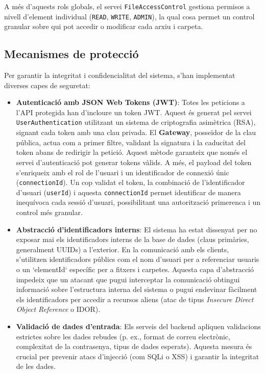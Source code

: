 A més d'aquests rols globals, el servei \texttt{FileAccessControl} gestiona permisos a nivell d'element individual (\texttt{READ}, \texttt{WRITE}, \texttt{ADMIN}), la qual cosa permet un control granular sobre qui pot accedir o modificar cada arxiu i carpeta.

\subsection{Mecanismes de protecció}
Per garantir la integritat i confidencialitat del sistema, s'han implementat diverses capes de seguretat:
\begin{itemize}
    \item \textbf{Autenticació amb JSON Web Tokens (JWT)}: Totes les peticions a l'API protegida han d'incloure un token JWT. Aquest és generat pel servei \texttt{UserAuthentication} utilitzant un sistema de criptografia asimètrica (RSA), signant cada token amb una clau privada. El \textbf{Gateway}, posseïdor de la clau pública, actua com a primer filtre, validant la signatura i la caducitat del token abans de redirigir la petició. Aquest mètode garanteix que només el servei d'autenticació pot generar tokens vàlids. A més, el payload del token s'enriqueix amb el rol de l'usuari i un identificador de connexió únic (\texttt{connectionId}). Un cop validat el token, la combinació de l'identificador d'usuari (\texttt{userId}) i aquesta \texttt{connectionId} permet identificar de manera inequívoca cada sessió d'usuari, possibilitant una autorització primerenca i un control més granular.
    
    \item \textbf{Abstracció d'identificadors interns}: El sistema ha estat dissenyat per no exposar mai els identificadors interns de la base de dades (claus primàries, generalment UUIDs) a l'exterior. En la comunicació amb els clients, s'utilitzen identificadors públics com el nom d'usuari per a referenciar usuaris o un `elementId` específic per a fitxers i carpetes. Aquesta capa d'abstracció impedeix que un atacant que pugui interceptar la comunicació obtingui informació sobre l'estructura interna del sistema o pugui endevinar fàcilment els identificadors per accedir a recursos aliens (atac de tipus \textit{Insecure Direct Object Reference} o IDOR).
    
    \item \textbf{Validació de dades d'entrada}: Els serveis del backend apliquen validacions estrictes sobre les dades rebudes (p. ex., format de correu electrònic, complexitat de la contrasenya, tipus de dades esperats). Aquesta mesura és crucial per prevenir atacs d'injecció (com SQLi o XSS) i garantir la integritat de les dades.
    

\end{itemize}
